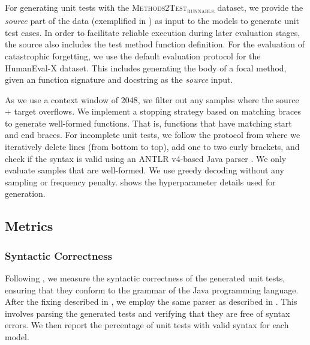 \documentclass[12pt]{book}
\begin{document}
For generating unit tests with the \textsc{Methods2Test\textsubscript{runnable}} dataset, we provide the \textit{source} part of the data (exemplified in  ) as input to the models to generate unit test cases. In order to facilitate reliable execution during later evaluation stages, the source also includes the test method function definition. For the evaluation of catastrophic forgetting, we use the default evaluation protocol for the HumanEval-X dataset. This includes generating the body of a focal method, given an function signature and docstring as the \textit{source} input.

As we use a context window of 2048, we filter out any samples where the source + target overflows. We implement a stopping strategy based on matching braces to generate well-formed functions. That is, functions that have matching start and end braces. For incomplete unit tests, we follow the protocol from \citet{siddiq2024using} where we iteratively delete lines (from bottom to top), add one to two curly brackets, and check if the syntax is valid using an ANTLR v4-based \citep{antlr4} Java parser \citep{java-antlr4}. We only evaluate samples that are well-formed. We use greedy decoding without any sampling or frequency penalty.
 shows the hyperparameter details used for generation. 

\subsection{Metrics}
\subsubsection{Syntactic Correctness}
Following \citet{yuan2023manual}, we measure the syntactic correctness of the generated unit tests, ensuring that they conform to the grammar of the Java programming language. After the fixing described in , we employ the same parser as described in . This involves parsing the generated tests and verifying that they are free of syntax errors. We then report the percentage of unit tests with valid syntax for each model.
\end{document}
